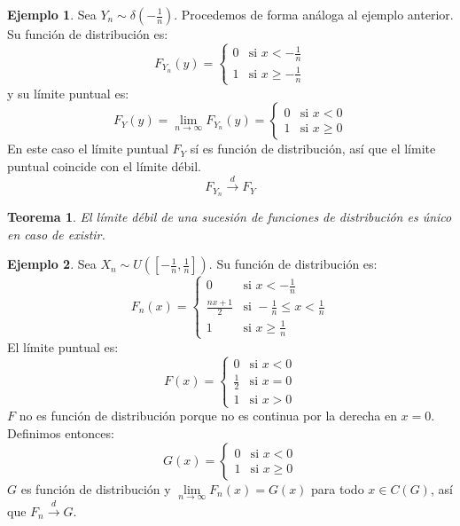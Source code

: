 \documentclass{report}
\newtheorem{theorem}{Teorema}[chapter]
\theoremstyle{remark}
\theoremstyle{remark}
\theoremstyle{remark}
\theoremstyle{definition}
\theoremstyle{definition}
\theoremstyle{definition}
\newtheorem*{example}{Ejemplo}
\theoremstyle{definition}
\begin{document}
\begin{example}
    Sea $Y_n \sim \delta(-\frac{1}{n})$.
    Procedemos de forma análoga al ejemplo anterior.
    Su función de distribución es:
    $$F_{Y_n}(y) = \begin{cases}
            0 & \text{si } x < -\frac{1}{n}    \\
            1 & \text{si } x \geq -\frac{1}{n}
        \end{cases}$$
    y su límite puntual es:
    $$F_Y(y) = \lim\limits_{n \to \infty} F_{Y_n}(y) = \begin{cases}
            0 & \text{si } x < 0    \\
            1 & \text{si } x \geq 0
        \end{cases}$$
    En este caso el límite puntual $F_Y$ sí es función de distribución, así que el límite puntual coincide con el límite débil.
    $$F_{Y_n} \xrightarrow{d} F_Y$$
\end{example}

\begin{theorem}
    El límite débil de una sucesión de funciones de distribución es único en caso de existir.
\end{theorem}

\begin{example}
    Sea $X_n \sim U([-\frac{1}{n}, \frac{1}{n}])$.
    Su función de distribución es:
    $$F_n(x) = \begin{cases}
            0              & \text{si } x < -\frac{1}{n}                  \\
            \frac{nx+1}{2} & \text{si } -\frac{1}{n} \leq x < \frac{1}{n} \\
            1              & \text{si } x \geq \frac{1}{n}
        \end{cases}$$
    El límite puntual es:
    $$F(x) = \begin{cases}
            0           & \text{si } x < 0 \\
            \frac{1}{2} & \text{si } x = 0 \\
            1           & \text{si } x > 0
        \end{cases}$$
    $F$ no es función de distribución porque no es continua por la derecha en $x = 0$.
    Definimos entonces:
    $$G(x) = \begin{cases}
            0 & \text{si } x < 0    \\
            1 & \text{si } x \geq 0
        \end{cases}$$
    $G$ es función de distribución y $\lim\limits_{n \to \infty} F_n(x) = G(x)$ para todo $x \in C(G)$, así que $F_n \xrightarrow{d} G$.
\end{example}
\end{document}
